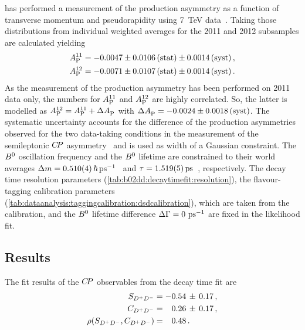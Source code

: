 \lhcb has performed a measurement of the production asymmetry as a function
of transverse momentum and pseudorapidity using \SI{7}{\TeV}
data~\cite{LHCb-PAPER-2014-042}. Taking those distributions from \BdToDD
individual weighted averages for the 2011 and 2012 subsamples are calculated
yielding
%
\begin{equation}
  \begin{split}
    A_\text{P}^{11} &= -0.0047 \pm 0.0106 \,\text{(stat)} \pm 0.0014 \, \text{(syst)} \,, \\
    A_\text{P}^{12} &= -0.0071 \pm 0.0107 \,\text{(stat)} \pm 0.0014 \, \text{(syst)} \,.
  \end{split}
\end{equation}
%
As the measurement of the production asymmetry has been performed on 2011 data
only, the numbers for $A_\text{P}^{11}$ and $A_\text{P}^{12}$ are highly
correlated. So, the latter is modelled as $A_\text{P}^{12} = A_\text{P}^{11} +
\Delta A_\text{P}^{}$ with $\Delta A_\text{P}^{} = -0.0024 \pm 0.0018
\,\text{(syst)}$. The systematic uncertainty accounts for the difference of
the production asymmetries observed for the two data-taking conditions in the
measurement of the semileptonic ${C\!P}$ asymmetry~\cite{LHCb-PAPER-2014-053} and
is used as width of a Gaussian constraint. The ${{B}^0}$ oscillation frequency and
the ${{B}^0}$ lifetime are constrained to their world averages $\dm =
\SI{0.510\pm0.004}{\planckbar\invps}$~\cite{HFAG} and $\tau =
\SI{1.519\pm0.005}{\ps}$~\cite{PDG2014}, respectively. The decay time
resolution parameters (\cref{tab:b02dd:decaytimefit:resolution}), the
flavour-tagging calibration parameters
(\cref{tab:dataanalysis:taggingcalibration:dsdcalibration}), which are taken
from the \BdToDsD calibration, and the ${{B}^0}$ lifetime difference ${\Delta\Gamma} =
\SI{0}{\ensuremath{{\mathrm{ \,ps^{-1}}}}}$ are fixed in the likelihood fit.

\subsection{Results}

The fit results of the ${C\!P}$ observables from the decay time fit are
\begin{align}
\begin{split}
  S_{{{D}^+}{{D}^-}}                &= -0.54\,\pm\,0.17 \, , \\
  C_{{{D}^+}{{D}^-}}                &= \phantom{-}0.26\,\pm\,0.17 \, , \\
  \rho(S_{{{D}^+}{{D}^-}},C_{{{D}^+}{{D}^-}})     &= \phantom{-}0.48 \, . \\
\end{split}
\label{eq:b02dd:decaytimefit:cpresults}
\end{align}

